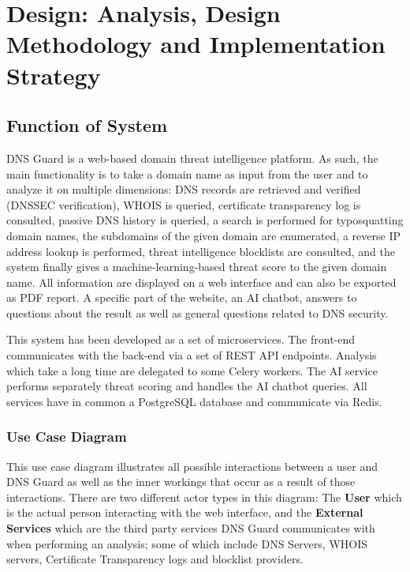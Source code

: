 \documentclass[12pt, a4paper, oneside]{report}
\begin{document}
\chapter*{Design: Analysis, Design Methodology and Implementation Strategy}
\setcounter{chapter}{3}
\setcounter{section}{0}

\section{Function of System}

DNS Guard is a web-based domain threat intelligence platform. As such, the main functionality is to take a domain name as input from the user and to analyze it on multiple dimensions: DNS records are retrieved and verified (DNSSEC verification), WHOIS is queried, certificate transparency log is consulted, passive DNS history is queried, a search is performed for typosquatting domain names, the subdomains of the given domain are enumerated, a reverse IP address lookup is performed, threat intelligence blocklists are consulted, and the system finally gives a machine-learning-based threat score to the given domain name. All information are displayed on a web interface and can also be exported as PDF report. A specific part of the website, an AI chatbot, answers to questions about the result as well as general questions related to DNS security.

This system has been developed as a set of microservices. The front-end communicates with the back-end via a set of REST API endpoints. Analysis which take a long time are delegated to some Celery workers. The AI service performs separately threat scoring and handles the AI chatbot queries. All services have in common a PostgreSQL database and communicate via Redis.

\subsection{Use Case Diagram}

This use case diagram illustrates all possible interactions between a user and DNS Guard as well as the inner workings that occur as a result of those interactions. There are two different actor types in this diagram: The \textbf{User} which is the actual person interacting with the web interface, and the \textbf{External Services} which are the third party services DNS Guard communicates with when performing an analysis; some of which include DNS Servers, WHOIS servers, Certificate Transparency logs and blocklist providers.
\end{document}
